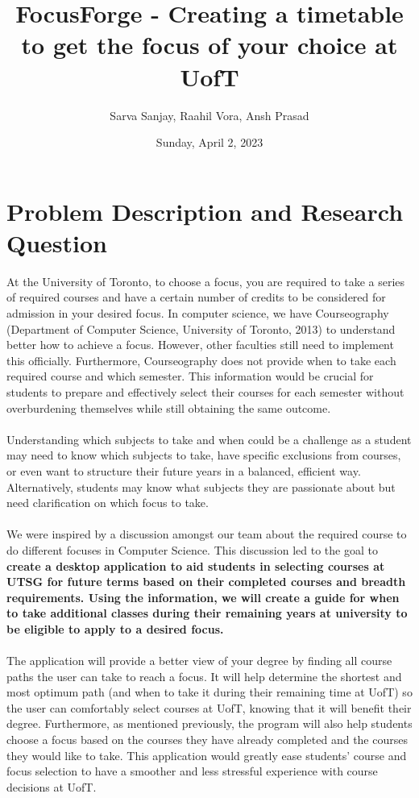 \documentclass[fontsize=11pt]{article}
\title {FocusForge - Creating a timetable to get the focus of your choice at UofT}
\author{Sarva Sanjay, Raahil Vora, Ansh Prasad}
\date{Sunday, April 2, 2023}
\begin{document}
\maketitle

\section*{Problem Description and Research Question}

At the University of Toronto, to choose a focus, you are required to take a series of required courses and have a certain number of credits to be considered for admission in your desired focus. In computer science, we have Courseography (Department of Computer Science, University of Toronto, 2013) to understand better how to achieve a focus. However, other faculties still need to implement this officially. Furthermore, Courseography does not provide when to take each required course and which semester. This information would be crucial for students to prepare and effectively select their courses for each semester without overburdening themselves while still obtaining the same outcome.
\\
\\Understanding which subjects to take and when could be a challenge as a student may need to know which subjects to take, have specific exclusions from courses, or even want to structure their future years in a balanced, efficient way. Alternatively, students may know what subjects they are passionate about but need clarification on which focus to take. 
\\
\\We were inspired by a discussion amongst our team about the required course to do different focuses in Computer Science. This discussion led to the goal to \textbf{create a desktop application to aid students in selecting courses at UTSG for future terms based on their completed courses and breadth requirements. Using the information, we will create a guide for when to take additional classes during their remaining years at university to be eligible to apply to a desired focus.} 
\\
\\The application will provide a better view of your degree by finding all course paths the user can take to reach a focus. It will help determine the shortest and most optimum path (and when to take it during their remaining time at UofT) so the user can comfortably select courses at UofT, knowing that it will benefit their degree. Furthermore, as mentioned previously, the program will also help students choose a focus based on the courses they have already completed and the courses they would like to take. This application would greatly ease students’ course and focus selection to have a smoother and less stressful experience with course decisions at UofT.
\end{document}
